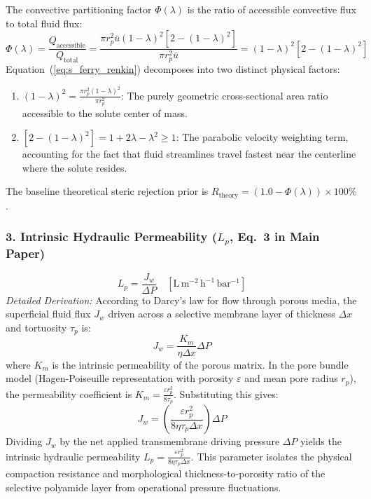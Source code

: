 \documentclass[11pt]{article}
\begin{document}
The convective partitioning factor $\Phi(\lambda)$ is the ratio of accessible convective flux to total fluid flux:
\begin{equation}
\Phi(\lambda) = \frac{Q_{\mathrm{accessible}}}{Q_{\mathrm{total}}} = \frac{\pi r_p^2 \bar{u} (1-\lambda)^2 \left[ 2 - (1-\lambda)^2 \right]}{\pi r_p^2 \bar{u}} = (1-\lambda)^2 \left[ 2 - (1-\lambda)^2 \right]
\label{eq:s_phi_final}
\end{equation}
Equation~(\ref{eq:s_ferry_renkin}) decomposes into two distinct physical factors:
\begin{enumerate}[leftmargin=1.0cm]
    \item $(1 - \lambda)^2 = \frac{\pi r_p^2(1-\lambda)^2}{\pi r_p^2}$: The purely geometric cross-sectional area ratio accessible to the solute center of mass.
    \item $\left[2 - (1 - \lambda)^2\right] = 1 + 2\lambda - \lambda^2 \ge 1$: The parabolic velocity weighting term, accounting for the fact that fluid streamlines travel fastest near the centerline where the solute resides.
\end{enumerate}
The baseline theoretical steric rejection prior is $R_{\mathrm{theory}} = (1.0 - \Phi(\lambda)) \times 100\%$.

\subsubsection{3. Intrinsic Hydraulic Permeability ($L_p$, Eq.~3 in Main Paper)}
\begin{equation}
L_p = \frac{J_w}{\Delta P} \quad \left[\mathrm{L\,m^{-2}\,h^{-1}\,bar^{-1}}\right]
\label{eq:s_lp}
\end{equation}
\noindent\textit{Detailed Derivation:} According to Darcy's law for flow through porous media, the superficial fluid flux $J_w$ driven across a selective membrane layer of thickness $\Delta x$ and tortuosity $\tau_p$ is:
\begin{equation}
J_w = \frac{K_m}{\eta \Delta x} \Delta P
\label{eq:s_darcy_law}
\end{equation}
where $K_m$ is the intrinsic permeability of the porous matrix. In the pore bundle model (Hagen-Poiseuille representation with porosity $\varepsilon$ and mean pore radius $r_p$), the permeability coefficient is $K_m = \frac{\varepsilon r_p^2}{8\tau_p}$. Substituting this gives:
\begin{equation}
J_w = \left( \frac{\varepsilon r_p^2}{8\eta \tau_p \Delta x} \right) \Delta P
\label{eq:s_darcy_hp}
\end{equation}
Dividing $J_w$ by the net applied transmembrane driving pressure $\Delta P$ yields the intrinsic hydraulic permeability $L_p = \frac{\varepsilon r_p^2}{8\eta \tau_p \Delta x}$. This parameter isolates the physical compaction resistance and morphological thickness-to-porosity ratio of the selective polyamide layer from operational pressure fluctuations.
\end{document}
